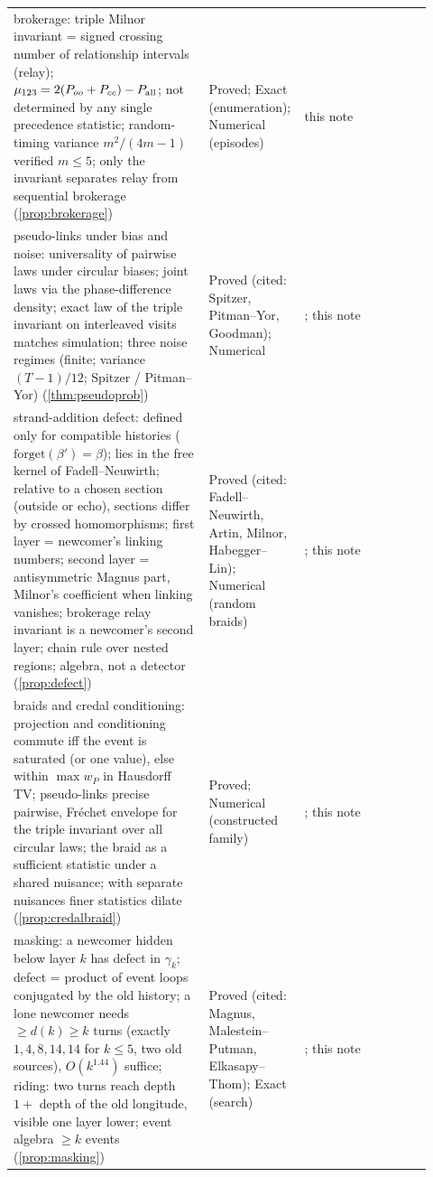 \documentclass[11pt]{article}
\theoremstyle{definition}\newtheorem{definition}[theorem]{Definition}\newtheorem{remark}[theorem]{Remark}\newtheorem{example}[theorem]{Example}\newtheorem{problem}[theorem]{Open problem}\crefname{problem}{Problem}{Problems}
\begin{document}
{\begin{longtable}{p{0.46\linewidth}p{0.16\linewidth}p{0.3\linewidth}}
\rowcolor{stNew} brokerage: triple Milnor invariant = signed crossing number of relationship intervals (relay); $\mu_{123}=2(P_{oo}+P_{cc})-P_{\rm all}$; not determined by any single precedence statistic; random-timing variance $m^2/(4m-1)$ verified $m\le5$; only the invariant separates relay from sequential brokerage (\cref{prop:brokerage}) & Proved; Exact (enumeration); Numerical (episodes) & this note\\
\rowcolor{stNew} pseudo-links under bias and noise: universality of pairwise laws under circular biases; joint laws via the phase-difference density; exact law of the triple invariant on interleaved visits matches simulation; three noise regimes (finite; variance $(T-1)/12$; Spitzer / Pitman--Yor) (\cref{thm:pseudoprob}) & Proved (cited: Spitzer, Pitman--Yor, Goodman); Numerical & \cite{Spitzer1958,PitmanYor1986,Goodman1985}; this note\\
\rowcolor{stNew} strand-addition defect: defined only for compatible histories ($\mathrm{forget}(\beta')=\beta$); lies in the free kernel of Fadell--Neuwirth; relative to a chosen section (outside or echo), sections differ by crossed homomorphisms; first layer = newcomer's linking numbers; second layer = antisymmetric Magnus part, Milnor's coefficient when linking vanishes; brokerage relay invariant is a newcomer's second layer; chain rule over nested regions; algebra, not a detector (\cref{prop:defect}) & Proved (cited: Fadell--Neuwirth, Artin, Milnor, Habegger--Lin); Numerical (random braids) & \cite{FadellNeuwirth1962,Artin1947,Milnor1954,HabeggerLin1990}; this note\\
\rowcolor{stNew} braids and credal conditioning: projection and conditioning commute iff the event is saturated (or one value), else within $\max w_P$ in Hausdorff TV; pseudo-links precise pairwise, Fr\'echet envelope for the triple invariant over all circular laws; the braid as a sufficient statistic under a shared nuisance; with separate nuisances finer statistics dilate (\cref{prop:credalbraid}) & Proved; Numerical (constructed family) & \cite{Walley1991,SeidenfeldWasserman1993}; this note\\
\rowcolor{stNew} masking: a newcomer hidden below layer $k$ has defect in $\gamma_k$; defect = product of event loops conjugated by the old history; a lone newcomer needs $\ge d(k)\ge k$ turns (exactly $1,4,8,14,14$ for $k\le5$, two old sources), $O(k^{1.44})$ suffice; riding: two turns reach depth $1+$ depth of the old longitude, visible one layer lower; event algebra $\ge k$ events (\cref{prop:masking}) & Proved (cited: Magnus, Malestein--Putman, Elkasapy--Thom); Exact (search) & \cite{MalesteinPutman2010,MalesteinPutman2023,ElkasapyThom2013,Elkasapy2016}; this note\\

\end{longtable}}
\end{document}
